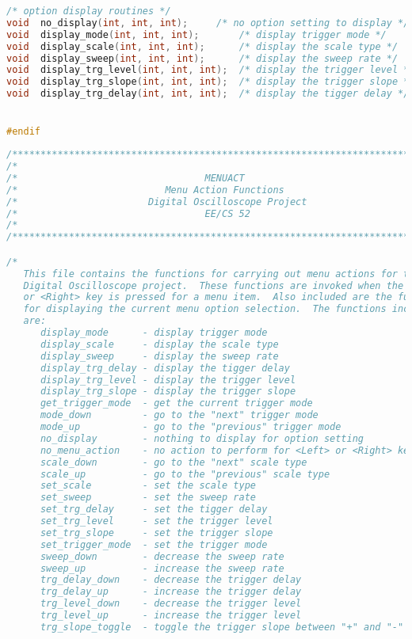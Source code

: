 \begin{lstlisting}[language=C]
/* option display routines */
void  no_display(int, int, int);	 /* no option setting to display */
void  display_mode(int, int, int);       /* display trigger mode */
void  display_scale(int, int, int);      /* display the scale type */
void  display_sweep(int, int, int);      /* display the sweep rate */
void  display_trg_level(int, int, int);  /* display the trigger level */
void  display_trg_slope(int, int, int);  /* display the trigger slope */
void  display_trg_delay(int, int, int);  /* display the tigger delay */


#endif
\end{lstlisting}

\begin{lstlisting}[language=C]
/****************************************************************************/
/*                                                                          */
/*                                 MENUACT                                  */
/*                          Menu Action Functions                           */
/*                       Digital Oscilloscope Project                       */
/*                                 EE/CS 52                                 */
/*                                                                          */
/****************************************************************************/

/*
   This file contains the functions for carrying out menu actions for the
   Digital Oscilloscope project.  These functions are invoked when the <Left>
   or <Right> key is pressed for a menu item.  Also included are the functions
   for displaying the current menu option selection.  The functions included
   are:
      display_mode      - display trigger mode
      display_scale     - display the scale type
      display_sweep     - display the sweep rate
      display_trg_delay - display the tigger delay
      display_trg_level - display the trigger level
      display_trg_slope - display the trigger slope
      get_trigger_mode  - get the current trigger mode
      mode_down         - go to the "next" trigger mode
      mode_up           - go to the "previous" trigger mode
      no_display        - nothing to display for option setting
      no_menu_action    - no action to perform for <Left> or <Right> key
      scale_down        - go to the "next" scale type
      scale_up          - go to the "previous" scale type
      set_scale         - set the scale type
      set_sweep         - set the sweep rate
      set_trg_delay     - set the tigger delay
      set_trg_level     - set the trigger level
      set_trg_slope     - set the trigger slope
      set_trigger_mode  - set the trigger mode
      sweep_down        - decrease the sweep rate
      sweep_up          - increase the sweep rate
      trg_delay_down    - decrease the trigger delay
      trg_delay_up      - increase the trigger delay
      trg_level_down    - decrease the trigger level
      trg_level_up      - increase the trigger level
      trg_slope_toggle  - toggle the trigger slope between "+" and "-"


\end{lstlisting}
